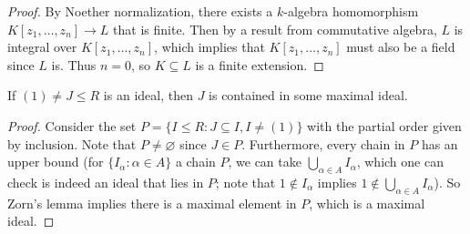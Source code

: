 \begin{proof}
  By Noether normalization,
  there exists a $k$-algebra homomorphism
  $K[z_1, \dots, z_n] \to L$
  that is finite. Then by a result from
  commutative algebra, $L$ is
  integral over $K[z_1, \dots, z_n]$,
  which implies that $K[z_1, \dots, z_n]$
  must also be a field since $L$ is.
  Thus $n = 0$, so $K \subseteq L$ is
  a finite extension.
\end{proof}

\begin{prop}\label{prop:in-maximal-ideal}
  If $(1) \ne J \le R$ is an ideal, then
  $J$ is contained in some maximal ideal.
\end{prop}

\begin{proof}
  Consider the set $P = \{I \le R : J \subseteq I, I \ne (1)\}$
  with the partial order given by inclusion.
  Note that $P \ne \varnothing$ since
  $J \in P$. Furthermore,
  every chain in $P$ has an upper bound
  (for $\{I_\alpha : \alpha \in A\}$ a
  chain $P$, we can take $\bigcup_{\alpha \in A} I_\alpha$, which one can
  check is indeed
  an ideal that lies in $P$; note
  that $1 \notin I_\alpha$ implies
  $1 \notin \bigcup_{\alpha \in A} I_\alpha$).
  So Zorn's lemma implies there is a
  maximal element in $P$, which is a
  maximal ideal.
\end{proof}

